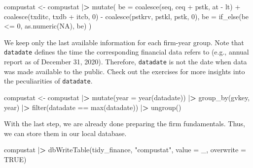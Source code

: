 \documentclass[
]{book}
\newenvironment{Shaded}{\begin{snugshade}}{\end{snugshade}}
\newcommand{\AttributeTok}[1]{\textcolor[rgb]{0.61,0.61,0.61}{#1}}
\newcommand{\ConstantTok}[1]{\textcolor[rgb]{0,0,0}{#1}}
\newcommand{\DecValTok}[1]{\textcolor[rgb]{0.06,0.06,0.06}{#1}}
\newcommand{\ErrorTok}[1]{\textcolor[rgb]{0.14,0.14,0.14}{\textbf{#1}}}
\newcommand{\FunctionTok}[1]{\textcolor[rgb]{0,0,0}{#1}}
\newcommand{\NormalTok}[1]{#1}
\newcommand{\OtherTok}[1]{\textcolor[rgb]{0.37,0.37,0.37}{#1}}
\newcommand{\SpecialCharTok}[1]{\textcolor[rgb]{0,0,0}{#1}}
\newcommand{\StringTok}[1]{\textcolor[rgb]{0.5,0.5,0.5}{#1}}
\begin{document}
\begin{Shaded}
\begin{Highlighting}[]
\NormalTok{compustat }\OtherTok{\textless{}{-}}\NormalTok{ compustat }\SpecialCharTok{|}\ErrorTok{\textgreater{}}
  \FunctionTok{mutate}\NormalTok{(}
    \AttributeTok{be =} \FunctionTok{coalesce}\NormalTok{(seq, ceq }\SpecialCharTok{+}\NormalTok{ pstk, at }\SpecialCharTok{{-}}\NormalTok{ lt) }\SpecialCharTok{+}
      \FunctionTok{coalesce}\NormalTok{(txditc, txdb }\SpecialCharTok{+}\NormalTok{ itcb, }\DecValTok{0}\NormalTok{) }\SpecialCharTok{{-}}
      \FunctionTok{coalesce}\NormalTok{(pstkrv, pstkl, pstk, }\DecValTok{0}\NormalTok{),}
    \AttributeTok{be =} \FunctionTok{if\_else}\NormalTok{(be }\SpecialCharTok{\textless{}=} \DecValTok{0}\NormalTok{, }\FunctionTok{as.numeric}\NormalTok{(}\ConstantTok{NA}\NormalTok{), be)}
\NormalTok{  )}
\end{Highlighting}
\end{Shaded}

We keep only the last available information for each firm-year group. Note that \texttt{datadate} defines the time the corresponding financial data refers to (e.g., annual report as of December 31, 2020). Therefore, \texttt{datadate} is not the date when data was made available to the public. Check out the exercises for more insights into the peculiarities of \texttt{datadate}.

\begin{Shaded}
\begin{Highlighting}[]
\NormalTok{compustat }\OtherTok{\textless{}{-}}\NormalTok{ compustat }\SpecialCharTok{|}\ErrorTok{\textgreater{}}
  \FunctionTok{mutate}\NormalTok{(}\AttributeTok{year =} \FunctionTok{year}\NormalTok{(datadate)) }\SpecialCharTok{|}\ErrorTok{\textgreater{}}
  \FunctionTok{group\_by}\NormalTok{(gvkey, year) }\SpecialCharTok{|}\ErrorTok{\textgreater{}}
  \FunctionTok{filter}\NormalTok{(datadate }\SpecialCharTok{==} \FunctionTok{max}\NormalTok{(datadate)) }\SpecialCharTok{|}\ErrorTok{\textgreater{}}
  \FunctionTok{ungroup}\NormalTok{()}
\end{Highlighting}
\end{Shaded}

With the last step, we are already done preparing the firm fundamentals. Thus, we can store them in our local database.

\begin{Shaded}
\begin{Highlighting}[]
\NormalTok{compustat }\SpecialCharTok{|}\ErrorTok{\textgreater{}}
  \FunctionTok{dbWriteTable}\NormalTok{(tidy\_finance, }
               \StringTok{"compustat"}\NormalTok{, }
               \AttributeTok{value =}\NormalTok{ \_, }
               \AttributeTok{overwrite =} \ConstantTok{TRUE}\NormalTok{)}
\end{Highlighting}
\end{Shaded}
\end{document}
